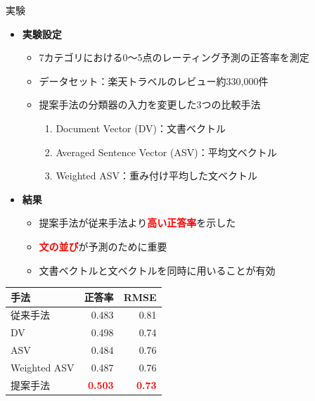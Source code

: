 \documentclass[unicode,10pt]{beamer}
\newlength{\mycolumnwidth}
\newcommand{\itemtitle}[1]{\textbf{#1}\\}
\newcommand{\fire}[1]{\textcolor{red}{\textbf{#1}}}
\newcommand{\doublecolumns}[4]{
    \begin{minipage}[t]{#1}
      #2
    \end{minipage}
    \begin{minipage}[t]{#3}
      #4
    \end{minipage}}
\begin{document}
\begin{frame}[t]
\begin{columns}[onlytextwidth,t]
\begin{column}{\mycolumnwidth}
  \begin{block}{実験}
    \begin{itemize}
      \item \itemtitle{実験設定}
        \begin{itemize}
          \item 7カテゴリにおける0〜5点のレーティング予測の正答率を測定
          \item データセット：楽天トラベルのレビュー約330,000件
          \item 提案手法の分類器の入力を変更した3つの比較手法
            \begin{enumerate}
              \item Document Vector (DV)：文書ベクトル
              \item Averaged Sentence Vector (ASV)：平均文ベクトル
              \item Weighted ASV：重み付け平均した文ベクトル
            \end{enumerate}
        \end{itemize}
    \end{itemize}

      \begin{itemize}
        \item \itemtitle{結果}
          \begin{itemize}
            \item 提案手法が従来手法より\fire{高い正答率}を示した
            \item \fire{文の並び}が予測のために重要
            \item 文書ベクトルと文ベクトルを同時に用いることが有効
          \end{itemize}
      \end{itemize}
      \begin{table}
        \centering
        \begin{tabular}{l | r r}
          手法 & 正答率 & RMSE \\
          \hline
          従来手法\cite{fujitani15} & 0.483 & 0.81 \\
          DV & 0.498 & 0.74 \\
          ASV & 0.484 & 0.76 \\
          Weighted ASV & 0.487 & 0.76 \\
          提案手法 & \fire{0.503} & \fire{0.73} \\
        \end{tabular}
      \end{table}
  \end{block}


\end{column}
\end{columns}
\end{frame}
\end{document}
